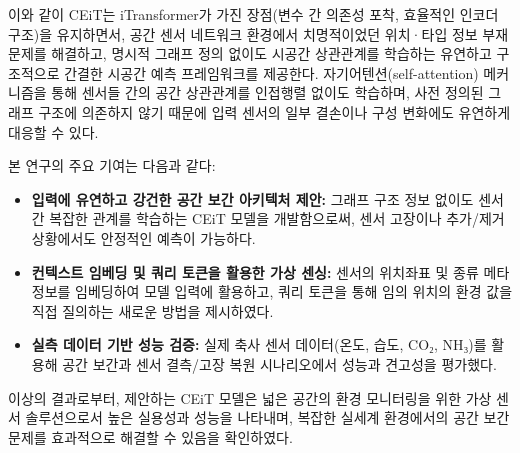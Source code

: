 \documentclass[final,5p,times,twocolumn,authoryear]{elsarticle}
\begin{document}
이와 같이 CEiT는 iTransformer가 가진 장점(변수 간 의존성 포착, 효율적인 인코더 구조)을 유지하면서, 공간 센서 네트워크 환경에서 치명적이었던 위치·타입 정보 부재 문제를 해결하고, 명시적 그래프 정의 없이도 시공간 상관관계를 학습하는 유연하고 구조적으로 간결한 시공간 예측 프레임워크를 제공한다. 자기어텐션(self-attention) 메커니즘을 통해 센서들 간의 공간 상관관계를 인접행렬 없이도 학습하며, 사전 정의된 그래프 구조에 의존하지 않기 때문에 입력 센서의 일부 결손이나 구성 변화에도 유연하게 대응할 수 있다.


본 연구의 주요 기여는 다음과 같다:

\begin{itemize}
    \item \textbf{입력에 유연하고 강건한 공간 보간 아키텍처 제안:} 그래프 구조 정보 없이도 센서 간 복잡한 관계를 학습하는 CEiT 모델을 개발함으로써, 센서 고장이나 추가/제거 상황에서도 안정적인 예측이 가능하다.
    
    \item \textbf{컨텍스트 임베딩 및 쿼리 토큰을 활용한 가상 센싱:} 센서의 위치좌표 및 종류 메타정보를 임베딩하여 모델 입력에 활용하고, 쿼리 토큰을 통해 임의 위치의 환경 값을 직접 질의하는 새로운 방법을 제시하였다. 
    
    \item \textbf{실측 데이터 기반 성능 검증:} 실제 축사 센서 데이터(온도, 습도, CO₂, NH₃)를 활용해 공간 보간과 센서 결측/고장 복원 시나리오에서 성능과 견고성을 평가했다.
\end{itemize}

이상의 결과로부터, 제안하는 CEiT 모델은 넓은 공간의 환경 모니터링을 위한 가상 센서 솔루션으로서 높은 실용성과 성능을 나타내며, 복잡한 실세계 환경에서의 공간 보간 문제를 효과적으로 해결할 수 있음을 확인하였다.



\end{document}
